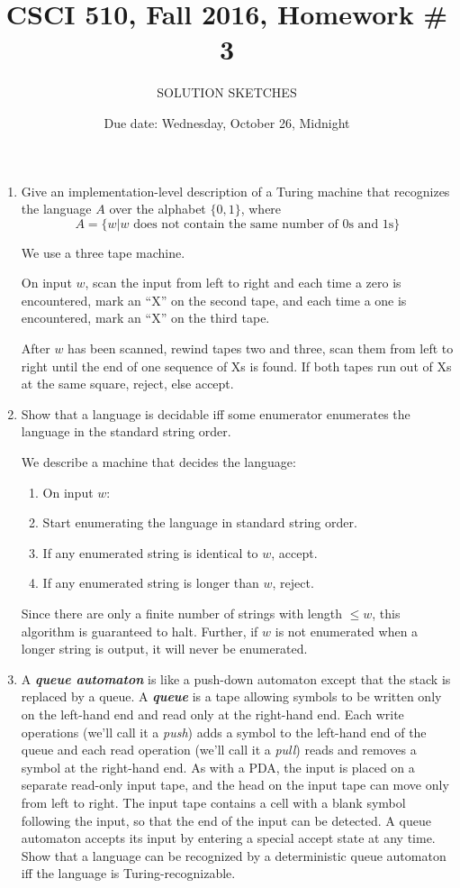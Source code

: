 \documentclass{article}
\title{CSCI 510, Fall 2016, Homework \# 3}
\author{SOLUTION SKETCHES}
\date{Due date: Wednesday, October 26, Midnight}
\begin{document}
\maketitle
\begin{enumerate}
\item Give an implementation-level description of a Turing machine
  that recognizes the language $A$ over the alphabet $\{0,1\}$, where
  \[
A=  \{w | \mbox{$w$ does not contain the same number of 0s and 1s}\}
\]

\hrulefill

We use a three tape machine.

On input $w$, scan the input from left to right and each time a zero
is encountered, mark an ``X'' on the second tape, and each time a one
is encountered, mark an ``X'' on the third tape.

After $w$ has been scanned, rewind tapes two and three, scan them from
left to right until the end of one sequence of Xs is found.  If both
tapes run out of Xs at the same square, reject, else accept.



\item Show that a language is decidable iff some enumerator enumerates
  the language in the standard string order.

\hrulefill

  We describe a machine that decides the language:
  \begin{enumerate}
  \item On input $w$:
  \item Start enumerating the language in standard string order.
  \item If any enumerated string is identical to $w$, accept.
  \item If any enumerated string is longer than $w$, reject.
  \end{enumerate}
  Since there are only a finite number of strings with length $\leq
  w$, this algorithm is guaranteed to halt.  Further, if $w$ is not
  enumerated when a longer string is output, it will never be
  enumerated. 

\item A {\bf\em queue automaton} is like a push-down automaton except
  that the stack is replaced by a queue.  A {\bf\em queue} is a tape
  allowing symbols to be written only on the left-hand end and read
  only at the right-hand end.  Each write operations (we'll call it a
  {\em push}) adds a symbol to the left-hand end of the queue and each
  read operation (we'll call it a {\em pull}) reads and removes a
  symbol at the right-hand end.  As with a {\sf PDA}, the input is
  placed on a separate read-only input tape, and the head on the input
  tape can move only from left to right.  The input tape contains a
  cell with a blank symbol following the input, so that the end of the
  input can be detected.  A queue automaton accepts its input by
  entering a special accept state at any time.  Show that a language
  can be recognized by a deterministic queue automaton iff the
  language is Turing-recognizable.


\end{enumerate}
\end{document}
